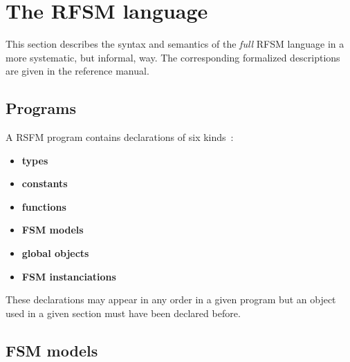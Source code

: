\chapter{The RFSM language}
\label{cha:language}

This section describes the syntax and semantics of the \emph{full} RFSM language in a more
systematic, but informal, way. The corresponding formalized descriptions are given in the reference
manual.

\section{Programs}
\label{sec:programs}

A RSFM program contains declarations of six kinds~: 
\begin{itemize}
\item \textbf{types}
\item \textbf{constants}
\item \textbf{functions}
\item \textbf{FSM models}
\item \textbf{global objects}
\item \textbf{FSM instanciations}
\end{itemize}

These declarations may appear in any order in a given program but an object used in a given section must
have been declared before. 

\section{FSM models}
\label{sec:fsm-models}


